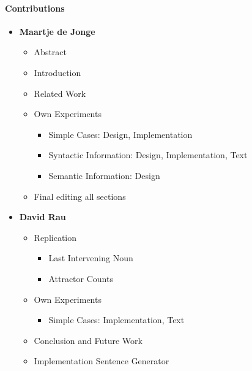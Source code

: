 \paragraph{Contributions}

\begin{itemize}
  \item \textbf{Maartje de Jonge}
  \begin{itemize}
    \item Abstract
    \item Introduction
    \item Related Work
    \item Own Experiments
    \begin{itemize}
       \item Simple Cases: Design, Implementation
       \item Syntactic Information: Design, Implementation, Text
       \item Semantic Information: Design
    \end{itemize}
    \item Final editing all sections        
  \end{itemize}

  \item \textbf{David Rau}
    \begin{itemize}
     \item Replication
      \begin{itemize}
         \item Last Intervening Noun
         \item Attractor Counts
      \end{itemize}    
     \item Own Experiments
    \begin{itemize}
       \item Simple Cases: Implementation, Text
    \end{itemize}        
      \item Conclusion and Future Work
      \item Implementation Sentence Generator
  \end{itemize}


\end{itemize}


